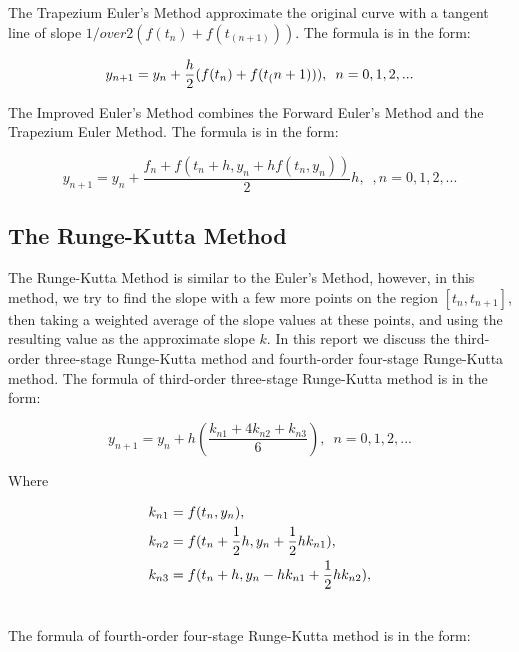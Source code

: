 \documentclass[a4paper]{article}
\begin{document}
	The Trapezium Euler’s Method approximate the original curve with a tangent line of slope ${1/over2}(f(t_n )+f(t_(n+1)))$. The formula is in the form:
	
	\begin{equation}\label{eq.1}
		y_{n+1} = y_n + {h\over2}(f(t_n )+f(t_(n+1))), \enspace n = 0,1,2,...
	\end{equation}
	
	The Improved Euler’s Method combines the Forward Euler’s Method and the Trapezium Euler Method. The formula is in the form:
	
	\begin{equation}\label{eq.3}
		y_{n+1} = y_n + \frac{f_n + f(t_n + h, y_n + hf(t_n, y_n))}{2}h, \enspace, n = 0,1,2,...
	\end{equation}	
	
	
	\subsection{The Runge-Kutta Method}
	
	The Runge-Kutta Method is similar to the Euler’s Method, however, in this method, we try to find the slope with a few more points on the region $[t_n, t_{n+1}]$, then taking a weighted average of the slope values at these points, and using the resulting value as the approximate slope $k$.
	In this report we discuss the third-order three-stage Runge-Kutta method and fourth-order four-stage Runge-Kutta method. The formula of third-order three-stage Runge-Kutta method is in the form:
	
	\begin{equation}\label{eq.4}
		y_{n+1} = y_n + h(\frac{k_{n1} + 4k_{n2} + k_{n3} }{6}), \enspace n = 0, 1, 2,...
	\end{equation}
	
	Where
	
	\begin{align} \nonumber
		k_{n1} &= f(t_n, y_n), \\ \nonumber
		k_{n2} &= f(t_n + {1 \over 2}h, y_n + {1 \over 2}hk_{n1}), \\ \nonumber
		k_{n3} &= f(t_n + h, y_n - hk_{n1} + {1 \over 2}hk_{n2}), \\ \nonumber
	\end{align}
	
	The formula of fourth-order four-stage Runge-Kutta method is in the form:
	
\end{document}

